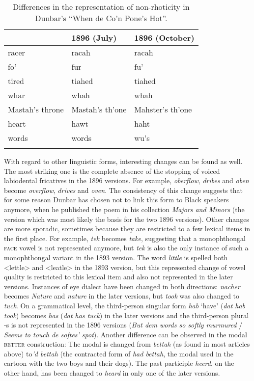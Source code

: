 \begin{table}
\begin{tabularx}{\textwidth}{XXl}
\lsptoprule
1893 & 1896 (July) & 1896 (October)\\
\midrule
racer & racah & racah\\
fo’ & fur & fu’\\
tired & tiahed & tiahed\\
whar & whah & whah\\
Mastah’s throne & Mastah’s th’one & Mahster’s th’one\\
heart & hawt & haht\\
words & words & wu’s\\
\lspbottomrule
\end{tabularx}
\caption{
Differences in the representation of non-rhoticity in Dunbar’s “When de Co’n Pone’s Hot”.
}
\label{tab:key:12}
\end{table}

With regard to other linguistic forms, interesting changes can be found as well. The most striking one is the complete absence of the stopping of voiced labiodental fricatives in the 1896 versions. For example, \emph{oberflow}, \emph{dribes} and \emph{oben} become \emph{overflow}, \emph{drives} and \emph{oven}. The consistency of this change suggests that for some reason Dunbar has chosen not to link this form to Black speakers anymore, when he published the poem in his collection \emph{Majors and Minors} (the version which was most likely the basis for the two 1896 versions). Other changes are more sporadic, sometimes because they are restricted to a few lexical items in the first place. For example, \emph{tek} becomes \emph{take}, suggesting that a monophthongal \textsc{face} vowel is not represented anymore, but \emph{tek} is also the only instance of such a monophthongal variant in the 1893 version. The word \emph{little} is spelled both <lettle> and <leatle> in the 1893 version, but this represented change of vowel quality is restricted to this lexical item and also not represented in the later versions. Instances of eye dialect have been changed in both directions: \emph{nacher} becomes \emph{Nature} and \emph{nature} in the later versions, but \emph{took} was also changed to \emph{tuck}. On a grammatical level, the third-person singular form \emph{hab} ‘have’ (\emph{dat hab took}) becomes \emph{has} (\emph{dat has tuck}) in the later versions and the third-person plural -s is not represented in the 1896 versions (\emph{But dem words so softly murmured} / \emph{Seems to touch de softes’ spot}). Another difference can be observed in the modal \textsc{better} construction: The modal is changed from \emph{bettah} (as found in most articles above) to\emph{’d bettah} (the contracted form of \emph{had bettah}, the modal used in the cartoon with the two boys and their dogs). The past participle \emph{heerd}, on the other hand, has been changed to \emph{heard} in only one of the later versions.

